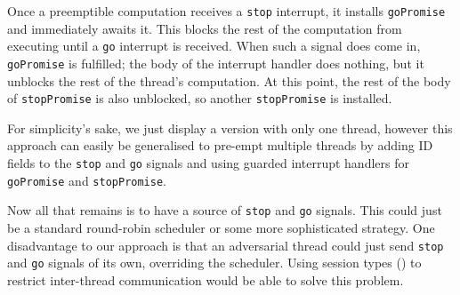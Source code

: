 \documentclass[msc,deptreport,cs]{infthesis} %
\newcommand{\code}[1]{\lstinline{#1}}
\begin{document}
Once a preemptible computation receives a \code{stop} interrupt, it installs
\code{goPromise} and immediately awaits it. This blocks the rest of the
computation from executing until a \code{go} interrupt is received. When such a
signal does come in, \code{goPromise} is fulfilled; the body of the interrupt
handler does nothing, but it unblocks the rest of the thread's computation. At
this point, the rest of the body of \code{stopPromise} is also unblocked, so
another \code{stopPromise} is installed.

For simplicity's sake, we just display a version with only one thread, however this approach can easily be generalised to pre-empt multiple threads by adding ID fields to the \code{stop} and \code{go} signals and using guarded interrupt handlers for \code{goPromise} and \code{stopPromise}.





Now all that remains is to have a source of \code{stop} and \code{go} signals.
This could just be a standard round-robin scheduler or some more sophisticated
strategy. One disadvantage to our approach is that an adversarial thread could
just send \code{stop} and \code{go} signals of its own, overriding the
scheduler. Using session types (\cite{honda1998language}) to restrict
inter-thread communication would be able to solve this problem.
\end{document}
